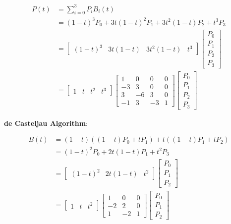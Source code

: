 \documentclass[9pt,landscape]{extarticle}
\begin{document}
\begin{multicols}{3}
\begin{align*}
    P(t) &= \sum_{i=0}^3 P_i B_i(t) \\
    &= (1-t)^3 P_0 + 3t(1-t)^2 P_1 + 3t^2(1-t) P_2 + t^3 P_3 \\
    &=  \begin{bmatrix}
            (1-t)^3 & 3t(1-t) & 3t^2(1-t) & t^3
        \end{bmatrix}
        \begin{bmatrix}
            P_0 \\
            P_1 \\
            P_2 \\
            P_3
        \end{bmatrix} \\
    &=  \begin{bmatrix}
            1 & t & t^2 & t^3
        \end{bmatrix}
        \begin{bmatrix}
            1 & 0 & 0 & 0 \\
            -3 & 3 & 0 & 0 \\
            3 & -6 & 3 & 0 \\
            -1 & 3 & -3 & 1
        \end{bmatrix}
        \begin{bmatrix}
            P_0 \\
            P_1 \\
            P_2 \\
            P_3
        \end{bmatrix}
\end{align*}

\textbf{de Casteljau Algorithm}:

\begin{align*}
B(t) &= (1-t)((1-t)P_0 + tP_1) + t((1-t)P_1 + tP_2) \\
&= (1-t)^2 P_0 + 2t(1-t)P_1 + t^2 P_3 \\
&=  \begin{bmatrix}
        (1-t)^2 & 2t(1-t) & t^2
    \end{bmatrix}
    \begin{bmatrix}
        P_0 \\
        P_1 \\
        P_2
    \end{bmatrix} \\
&=  \begin{bmatrix}
        1 & t & t^2
    \end{bmatrix}
    \begin{bmatrix}
        1 & 0 & 0 \\
        -2 & 2 & 0 \\
        1 & -2 & 1
    \end{bmatrix}
    \begin{bmatrix}
        P_0 \\
        P_1 \\
        P_2
    \end{bmatrix}
\end{align*}


\end{multicols}
\end{document}
